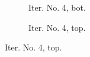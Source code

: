 \documentclass[a4paper,12pt]{amsart}
\numberwithin{equation}{section}
\begin{document}
\begin{figure}[h!]
\begin{subfigure}[t]{0.49\textwidth}
    \caption{Iter. No. 4, bot.}
\end{subfigure}
	\hfill
\begin{subfigure}[t]{0.49\textwidth}
    \caption{Iter. No. 4, top.}
\end{subfigure}


\end{figure}
\end{document}
